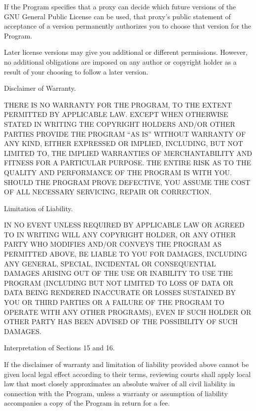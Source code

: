 If the Program specifies that a proxy can decide which future versions of the GNU General Public License can be used, that proxy's public statement of acceptance of a version permanently authorizes you to choose that version for the Program.

Later license versions may give you additional or different permissions.  However, no additional obligations are imposed on any author or copyright holder as a result of your choosing to follow a later version.

\item Disclaimer of Warranty.

\startframedtext
 THERE IS NO WARRANTY FOR THE PROGRAM, TO THE EXTENT PERMITTED BY APPLICABLE LAW.  EXCEPT WHEN OTHERWISE STATED IN WRITING THE COPYRIGHT HOLDERS AND/OR OTHER PARTIES PROVIDE THE PROGRAM ``AS IS'' WITHOUT WARRANTY OF ANY KIND, EITHER EXPRESSED OR IMPLIED, INCLUDING, BUT NOT LIMITED TO, THE IMPLIED WARRANTIES OF MERCHANTABILITY AND FITNESS FOR A PARTICULAR PURPOSE.  THE ENTIRE RISK AS TO THE QUALITY AND PERFORMANCE OF THE PROGRAM IS WITH YOU. SHOULD THE PROGRAM PROVE DEFECTIVE, YOU ASSUME THE COST OF ALL NECESSARY SERVICING, REPAIR OR CORRECTION.
\stopframedtext

\item Limitation of Liability.

\startframedtext
 IN NO EVENT UNLESS REQUIRED BY APPLICABLE LAW OR AGREED TO IN WRITING WILL ANY COPYRIGHT HOLDER, OR ANY OTHER PARTY WHO MODIFIES AND/OR CONVEYS THE PROGRAM AS PERMITTED ABOVE, BE LIABLE TO YOU FOR DAMAGES, INCLUDING ANY GENERAL, SPECIAL, INCIDENTAL OR CONSEQUENTIAL DAMAGES ARISING OUT OF THE USE OR INABILITY TO USE THE PROGRAM (INCLUDING BUT NOT LIMITED TO LOSS OF DATA OR DATA BEING RENDERED INACCURATE OR LOSSES SUSTAINED BY YOU OR THIRD PARTIES OR A FAILURE OF THE PROGRAM TO OPERATE WITH ANY OTHER PROGRAMS), EVEN IF SUCH HOLDER OR OTHER PARTY HAS BEEN ADVISED OF THE POSSIBILITY OF SUCH DAMAGES.
\stopframedtext

\item Interpretation of Sections 15 and 16.

If the disclaimer of warranty and limitation of liability provided above cannot be given local legal effect according to their terms, reviewing courts shall apply local law that most closely approximates an absolute waiver of all civil liability in connection with the Program, unless a warranty or assumption of liability accompanies a copy of the Program in return for a fee.

